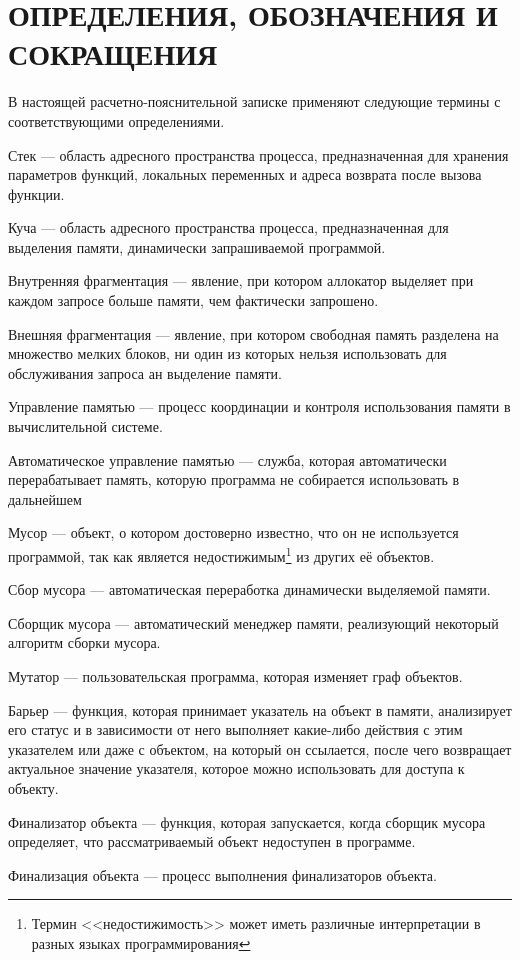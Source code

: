 \part*{ОПРЕДЕЛЕНИЯ, ОБОЗНАЧЕНИЯ И\\СОКРАЩЕНИЯ}
В настоящей расчетно-пояснительной записке применяют следующие термины с соответствующими определениями.

\begin{enumdescript}
	\item[Стек] --- область адресного пространства процесса, предназначенная для хранения параметров функций, локальных переменных и адреса возврата после вызова функции.
	\item[Куча] --- область адресного пространства процесса, предназначенная для выделения памяти, динамически запрашиваемой программой.
	\item[Внутренняя фрагментация] --- явление, при котором аллокатор выделяет при каждом запросе больше памяти, чем фактически запрошено.
	\item[Внешняя фрагментация] --- явление, при котором свободная память разделена на множество мелких блоков, ни один из которых нельзя использовать для обслуживания запроса ан выделение памяти.
	\item[Управление памятью] --- процесс координации и контроля использования памяти в вычислительной системе.
	\item[Автоматическое управление памятью] --- служба, которая автоматически перерабатывает память, которую программа не собирается использовать в дальнейшем
	\item[Мусор] --- объект, о котором достоверно известно, что он не используется программой, так как является недостижимым\footnote{Термин <<недостижимость>> может иметь различные интерпретации в разных языках программирования} из других её объектов.
	\item[Сбор мусора] --- автоматическая переработка динамически выделяемой памяти.
	\item[Сборщик мусора] --- автоматический менеджер памяти, реализующий некоторый алгоритм сборки мусора.
	\item[Мутатор] --- пользовательская программа, которая изменяет граф объектов.
	\item[Барьер] --- функция, которая принимает указатель на объект в памяти, анализирует его статус и в зависимости от него выполняет какие-либо действия с этим указателем или даже с объектом, на который он ссылается, после чего возвращает актуальное значение указателя, которое можно использовать для доступа к объекту.
	\item[Финализатор объекта] --- функция, которая запускается, когда сборщик мусора определяет, что рассматриваемый объект недоступен в программе.
	\item[Финализация объекта] --- процесс выполнения финализаторов объекта.
\end{enumdescript}
